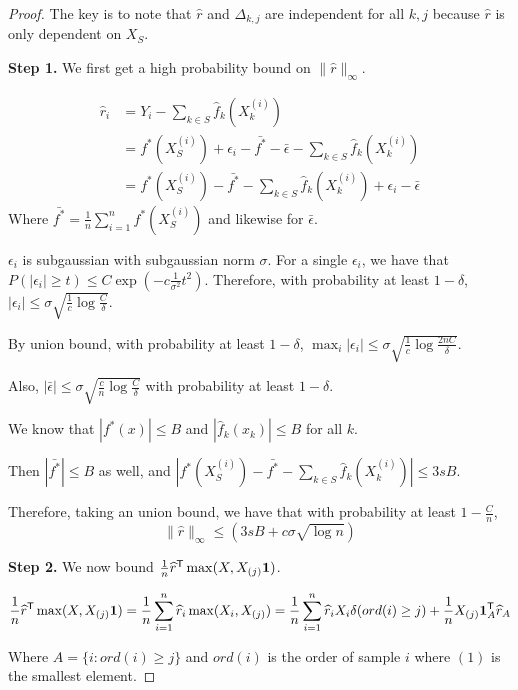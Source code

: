 \begin{proof}
The key is to note that $\hat{r}$ and $\Delta_{k,j}$ are independent for all $k,j$ because $\hat{r}$ is only dependent on $X_{S}$.

\textbf{Step 1.} We first get a high probability bound on $\| \hat{r} \|_\infty$. 

\begin{align*}
\hat{r}_i &= Y_i - \sum_{k \in S} \hat{f}_k (X_k^{(i)}) \\
	&= f^*(X_S^{(i)}) + \epsilon_i - \bar{f^*} - \bar{\epsilon}- \sum_{k \in S} \hat{f}_k(X_k^{(i)}) \\
	&=  f^*(X_S^{(i)}) - \bar{f^*} - \sum_{k \in S} \hat{f}_k(X_k^{(i)}) + \epsilon_i - \bar{\epsilon}
\end{align*}
Where $\bar{f^*} = \frac{1}{n} \sum_{i=1}^n f^*(X_S^{(i)})$ and likewise for $\bar{\epsilon}$.

$\epsilon_i$ is subgaussian with subgaussian norm $\sigma$. For a single $\epsilon_i$, we have that $P( |\epsilon_i| \geq t ) \leq C \exp( - c \frac{1}{\sigma^2} t^2)$. Therefore, with probability at least $1-\delta$, $|\epsilon_i| \leq \sigma\sqrt{ \frac{1}{c} \log \frac{C}{\delta}}$. 

By union bound, with probability at least $1-\delta$, $\max_i |\epsilon_i| \leq \sigma \sqrt{ \frac{1}{c} \log \frac{2nC}{\delta}}$.

Also, $|\bar{\epsilon}| \leq \sigma \sqrt{\frac{c}{n} \log \frac{C}{\delta}}$ with probability at least $1 - \delta$.

We know that $|f^*(x)| \leq B$ and $|\hat{f}_k(x_k)| \leq B$ for all $k$. 

Then $|\bar{f^*}| \leq B$ as well, and $|f^*(X_S^{(i)}) - \bar{f^*} - \sum_{k \in S} \hat{f}_k(X_k^{(i)})| \leq 3s B$.

Therefore, taking an union bound, we have that with probability at least $1-\frac{C}{n}$, 
\[
\| \hat{r} \|_\infty \leq (3 s B + c\sigma\sqrt{\log n}) 
\]


\textbf{Step 2.} We now bound $\frac{1}{n} \widehat{r}^{\mathsf{T}} \max( X, X_{(j)} \mbox{\boldmath $1$})$.

\[
\frac{1}{n} \widehat{r}^{\mathsf{T}} \max(X, X_{(j)} \mbox{\boldmath $1$}) = \frac{1}{n} \sum_{i=1}^n \widehat{r}_i \max(X_i, X_{(j)}) = \frac{1}{n} \sum_{i=1}^n \widehat{r}_i X_i \delta(ord(i) \geq j) + \frac{1}{n} X_{(j)} \mbox{\boldmath $1$}_A^{\mathsf{T}} \widehat{r}_A
\]

Where $A = \{ i : ord(i) \geq j\}$ and $ord(i)$ is the order of sample $i$ where $(1)$ is the smallest element.


\end{proof}
